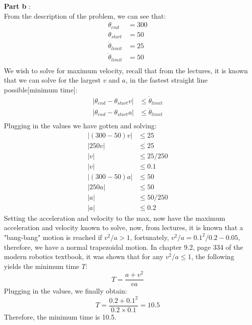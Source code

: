 \documentclass{article}
\begin{document}
\textbf{ Part b }:\\
From the description of the problem, we can see that:
\begin{align}
    \theta_{end} &= 300\\
    \theta_{start} &= 50\\
    \dot{\theta}_{limit} &= 25\\
    \ddot{\theta}_{limit} &= 50\\
\end{align}
We wish to solve for maximum velocity, recall that from the lectures, it is known that we can solve for the largest $v$ and $a$, in the fastest straight line possible[minimum time]:
\begin{align}
    |\theta_{end}-\theta_{start}v| & \leq  \dot{\theta}_{limit}\\ 
     |\theta_{end}-\theta_{start}a| & \leq  \ddot{\theta}_{limit}\\
\end{align}
Plugging in the values we have gotten and solving:
\begin{align}
    |(300-50)v| & \leq  25\\ 
    |250v| & \leq 25\\
    |v|  &\leq 25/250\\
    |v|  &\leq 0.1\\
     |(300-50)a| & \leq  50\\
     |250a| & \leq 50\\
     |a| & \leq 50/250\\
     |a|  &\leq 0.2
\end{align}
Setting the acceleration and velocity to the max, now have the maximum acceleration and velocity known to solve, now, from lectures, it is known that a "bang-bang" motion is reached if $v^2/a > 1$, fortunately, $v^2/a = 0.1^2/0.2-0.05$, therefore, we have a normal trapezoidal motion. In chapter 9.2, page 334 of the modern robotics textbook, it was shown that for any $v^2/a\leq 1$, the following yields the minimum time $T$:
$$T= \frac{a+v^2}{va}$$
Plugging in the values, we finally obtain:
$$T=\frac{0.2+0.1^2}{0.2 \times 0.1}=10.5$$
Therefore, the minimum time is 10.5.
\end{document}
